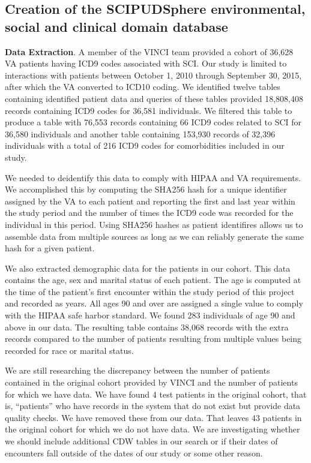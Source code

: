 \documentclass{amia}
\begin{document}
\subsection{Creation of the SCIPUDSphere environmental, social and clinical domain database}
{\bf Data Extraction}. A member of the VINCI team provided a cohort of 36,628 VA patients having ICD9 codes associated with SCI. Our study is limited to interactions with patients between October 1, 2010 through September 30, 2015, after which the VA converted to ICD10 coding. We identified twelve tables containing identified patient data and queries of these tables provided 18,808,408 records containing ICD9 codes for 36,581 individuals.  We filtered this table to produce a table with 76,553 records containing 66 ICD9 codes related to SCI for 36,580 individuals and another table containing 153,930 records of 32,396 individuals with a total of 216 ICD9 codes for comorbidities included in our study.

We needed to deidentify this data to comply with HIPAA and VA requirements.  We accomplished this by computing the SHA256 hash for a unique identifier assigned by the VA to each patient and reporting the first and last year within the study period and the number of times the ICD9 code was recorded for the individual in this period.  Using SHA256 hashes as patient identifires allows us to assemble data from multiple sources as long as we can reliably generate the same hash for a given patient.

We also extracted demographic data for the patients in our cohort.  This data contains the age, sex and marital status of each patient. The age is computed at the time of the patient's first encounter within the study period of this project and recorded as years. All ages 90 and over are assigned a single value to comply with the HIPAA safe harbor standard.  We found 283 individuals of age 90 and above in our data. The resulting table contains 38,068 records with the extra records compared to the number of patients resulting from multiple values being recorded for race or marital status.

We are still researching the discrepancy between the number of patients contained in the original cohort provided by VINCI and the number of patients for which we have data.  We have found 4 test patients in the original cohort, that is, ``patients'' who have records in the system that do not exist but provide data quality checks.  We have removed these from our data.  That leaves 43 patients in the original cohort for which we do not have data.  We are investigating whether we should include additional CDW tables in our search or if their dates of encounters fall outside of the dates of our study or some other reason.
\end{document}
